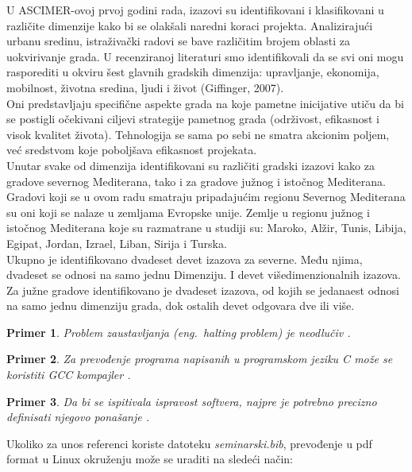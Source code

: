 \documentclass[a4paper,12pt]{article}
\newtheorem{primer}{Primer}[section]
\begin{document}
{U ASCIMER-ovoj prvoj godini rada, izazovi su identifikovani i klasifikovani u različite dimenzije kako bi se olakšali naredni koraci projekta. Analizirajući urbanu sredinu, istraživački radovi se bave različitim brojem oblasti za uokvirivanje grada. U recenziranoj literaturi smo identifikovali da se svi oni mogu rasporediti u okviru šest glavnih gradskih dimenzija: upravljanje, ekonomija, mobilnost, životna sredina, ljudi i život (Giffinger, 2007). \\

Oni predstavljaju specifične aspekte grada na koje pametne inicijative utiču da bi se postigli očekivani ciljevi strategije pametnog grada (održivost, efikasnost i visok kvalitet života). Tehnologija se sama po sebi ne smatra akcionim poljem, već sredstvom koje poboljšava efikasnost projekata. \\

Unutar svake od dimenzija identifikovani su različiti gradski izazovi kako za gradove severnog Mediterana, tako i za gradove južnog i istočnog Mediterana. Gradovi koji se u ovom radu smatraju pripadajućim regionu Severnog Mediterana su oni koji se nalaze u zemljama Evropske unije. Zemlje u regionu južnog i istočnog Mediterana koje su razmatrane u studiji su: Maroko, Alžir, Tunis, Libija, Egipat, Jordan, Izrael, Liban, Sirija i Turska. \\

Ukupno je identifikovano dvadeset devet izazova za severne. Među njima, dvadeset se odnosi na samo jednu Dimenziju. I devet višedimenzionalnih izazova. Za južne gradove identifikovano je dvadeset izazova, od kojih se jedanaest odnosi na samo jednu dimenziju grada, dok ostalih devet odgovara dve ili više.\\


\begin{primer}
Problem zaustavljanja (eng.~{\em halting problem}) je neodlučiv \cite{haltingproblem}.
\end{primer}

\begin{primer}
Za prevođenje programa napisanih u programskom jeziku C može se koristiti GCC kompajler \cite{gcc}.
\end{primer}

\begin{primer}
 Da bi se ispitivala ispravost softvera, najpre je potrebno precizno definisati njegovo ponašanje \cite{laski2009software}. 
\end{primer}

Ukoliko za unos referenci koriste datoteku {\em seminarski.bib},  prevođenje u pdf format u Linux okruženju može se uraditi na sledeći način:

}
\end{document}
